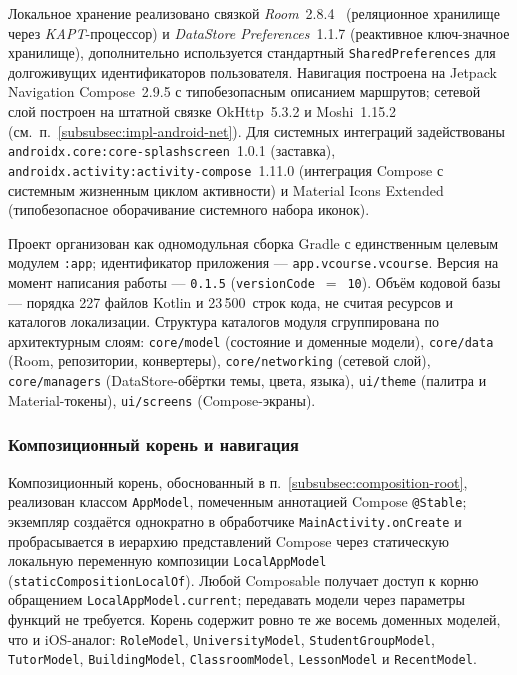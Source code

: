 Локальное хранение реализовано связкой \emph{Room}~2.8.4~\cite{android-room} (реляционное хранилище через \emph{KAPT}-процессор) и \emph{DataStore Preferences}~1.1.7 (реактивное ключ-значное хранилище), дополнительно используется стандартный \texttt{SharedPreferences} для долгоживущих идентификаторов пользователя. Навигация построена на Jetpack Navigation Compose~2.9.5 с типобезопасным описанием маршрутов; сетевой слой построен на штатной связке OkHttp~5.3.2 и Moshi~1.15.2 (см.~п.~\ref{subsubsec:impl-android-net}). Для системных интеграций задействованы \texttt{androidx.\allowbreak core:\allowbreak core-splashscreen}~1.0.1 (заставка), \texttt{androidx.\allowbreak activity:\allowbreak activity-compose}~1.11.0 (интеграция Compose с системным жизненным циклом активности) и Material Icons Extended (типобезопасное оборачивание системного набора иконок).

Проект организован как одномодульная сборка Gradle с единственным целевым модулем \texttt{:app}; идентификатор приложения --- \texttt{app.vcourse.vcourse}. Версия на момент написания работы --- \texttt{0.1.5} (\texttt{versionCode}~$=$~\texttt{10}). Объём кодовой базы --- порядка 227 файлов Kotlin и 23\,500~строк кода, не считая ресурсов и каталогов локализации. Структура каталогов модуля сгруппирована по архитектурным слоям: \texttt{core/\allowbreak model} (состояние и доменные модели), \texttt{core/\allowbreak data} (Room, репозитории, конвертеры), \texttt{core/\allowbreak networking} (сетевой слой), \texttt{core/\allowbreak managers} (DataStore-обёртки темы, цвета, языка), \texttt{ui/\allowbreak theme} (палитра и Material-токены), \texttt{ui/\allowbreak screens} (Compose-экраны).

\subsubsection{Композиционный корень и навигация}
\label{subsubsec:impl-android-app-model}

Композиционный корень, обоснованный в п.~\ref{subsubsec:composition-root}, реализован классом \texttt{AppModel}, помеченным аннотацией Compose \texttt{@Stable}; экземпляр создаётся однократно в обработчике \texttt{MainActivity.\allowbreak onCreate} и пробрасывается в иерархию представлений Compose через статическую локальную переменную композиции \texttt{LocalAppModel} (\texttt{staticCompositionLocalOf}). Любой Composable получает доступ к корню обращением \texttt{LocalAppModel.\allowbreak current}; передавать модели через параметры функций не требуется. Корень содержит ровно те же восемь доменных моделей, что и iOS-аналог: \texttt{RoleModel}, \texttt{UniversityModel}, \texttt{StudentGroupModel}, \texttt{TutorModel}, \texttt{BuildingModel}, \texttt{ClassroomModel}, \texttt{LessonModel} и \texttt{RecentModel}.

